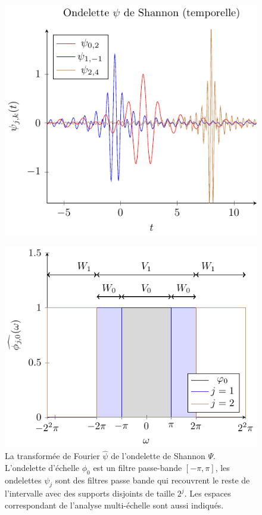 \begin{figure}
	{\includegraphics{Figs/shannonspat}}
\end{figure}
\begin{figure}
	\centering
	\includegraphics[width=17cm]{Figs/shannonfreq}
	\caption{La transformée de Fourier $\hat{\psi}$ de l'ondelette de Shannon $\Psi$. L'ondelette d'échelle $\phi_0$ est un filtre passe-bande $[-\pi, \pi]$, les ondelettes $ \psi_j$ sont des filtres passe bande qui recouvrent le reste de l'intervalle avec des supports disjoints de taille $2^{j}$. Les espaces correspondant de l'analyse multi-échelle sont aussi indiqués.
	}
\end{figure}
